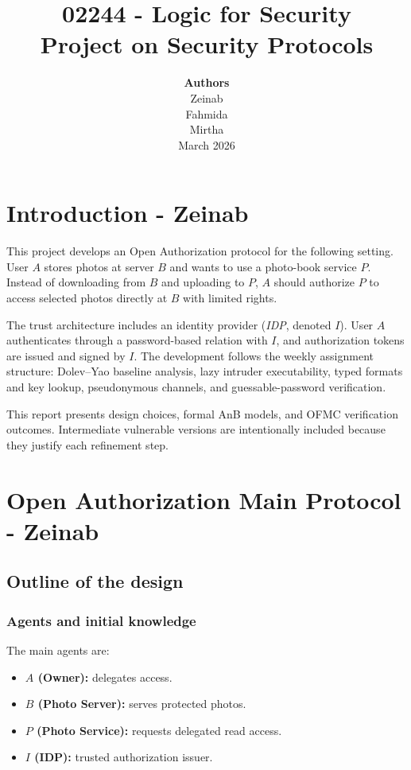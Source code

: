 \documentclass[11pt,a4paper]{article}
\title{02244 - Logic for Security\\
\vspace{0.5em}
Project on Security Protocols}
\author{%
  \textbf{Authors}\\[0.5em]
  Zeinab\\
  Fahmida\\
  Mirtha\\[1em]
  March 2026
}
\date{}
\begin{document}
\maketitle
\thispagestyle{empty}

\newpage
\tableofcontents
\newpage

\section{Introduction - Zeinab}

\noindent
This project develops an Open Authorization protocol for the following setting.
User $A$ stores photos at server $B$ and wants to use a photo-book service $P$.
Instead of downloading from $B$ and uploading to $P$, $A$ should authorize $P$ to access selected photos directly at $B$ with limited rights.

The trust architecture includes an identity provider (\textit{IDP}, denoted $I$).
User $A$ authenticates through a password-based relation with $I$, and authorization tokens are issued and signed by $I$.
The development follows the weekly assignment structure:
Dolev--Yao baseline analysis, lazy intruder executability, typed formats and key lookup, pseudonymous channels, and guessable-password verification.

This report presents design choices, formal AnB models, and OFMC verification outcomes.
Intermediate vulnerable versions are intentionally included because they justify each refinement step.

\newpage
\section{Open Authorization Main Protocol - Zeinab}

\subsection{Outline of the design}

\subsubsection{Agents and initial knowledge}
The main agents are:
\begin{itemize}
  \item \textbf{$A$ (Owner):} delegates access.
  \item \textbf{$B$ (Photo Server):} serves protected photos.
  \item \textbf{$P$ (Photo Service):} requests delegated read access.
  \item \textbf{$I$ (IDP):} trusted authorization issuer.
\end{itemize}
\end{document}
